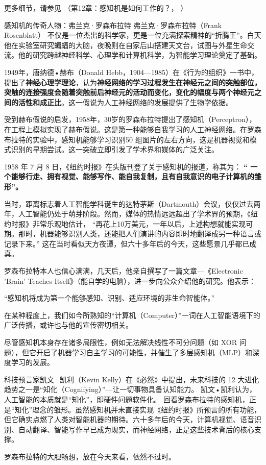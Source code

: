 更多细节，请参见 （第12章：感知机是如何工作的？， \cite{张玉宏2018深度学习之美}）

\begin{story}{感知机的传奇人物：弗兰克·罗森布拉特} 
弗兰克·罗森布拉特（Frank Rosenblatt） 不仅是一位杰出的科学家，更是一位充满探索精神的“折腾王”。白天他在实验室研究蝙蝠的大脑，夜晚则在自家后山搭建天文台，试图与外星生命交流。他的研究跨越神经科学、心理学和计算机科学，为智能学习理论奠定了基础。

1949年，唐纳德•赫布（Donald Hebb，1904—1985）在《行为的组织》一书中，提出了{\bf 神经心理学理论}，认为{\bf 神经网络的学习过程发生在神经元之间的突触部位，突触的连接强度会随着突触前后神经元的活动而变化，变化的幅度与两个神经元之间的活性和成正比}。这一假说为人工神经网络的发展提供了生物学依据。

受到赫布假说的启发，1958年，30岁的罗森布拉特提出了感知机（Perceptron），在工程上模拟实现了赫布假说。这是第一种能够自我学习的人工神经网络。在罗森布拉特的实验中，感知机能够学习识别50 组图片的左右方向，这是机器视觉和模式识别的早期尝试。这一突破立即引发了学术界和媒体的广泛关注。

1958 年 7 月 8 日，《纽约时报》在头版刊登了关于感知机的报道，称其为：
{\bf“ 一个能够行走、拥有视觉、能够写作、能自我复制，且有自我意识的电子计算机的雏形”。}

当时，距离标志着人工智能学科诞生的达特茅斯（Dartmouth）会议，仅仅过去两年，人工智能仍处于萌芽阶段。然而，媒体的热情远远超出了学术界的预期，《纽约时报》非常乐观地估计，
“再花上10万美元，一年以后，上述构想就能实现可期。那时，机器能够识别人类，还能把人们演讲的内容即时地翻译成另一种语言或记录下来。”
这在当时看似天方夜谭，但六十多年后的今天，这些愿景几乎都已成真。

罗森布拉特本人也信心满满，几天后，他亲自撰写了一篇文章---《Electronic 'Brain' Teaches Itself》（能自学的电脑），进一步向公众介绍他的研究。他表示：

“感知机将成为第一个能够感知、识别、适应环境的非生命智能体。”

在某种程度上，我们如今所熟知的“计算机（Computer）”一词在人工智能语境下的广泛传播，或许也与他的宣传密切相关。

尽管感知机本身存在诸多局限性，例如无法解决线性不可分问题（如 XOR 问题），但它开启了机器学习自主学习的可能性，并催生了多层感知机（MLP）和深度学习的发展。

科技预言家凯文·凯利（Kevin Kelly）在《必然》中提出，未来科技的 12 大进化趋势之一是“知化（Cognifying）”---让一切事物具备认知能力。
凯文•凯利认为，人工智能的本质就是“知化”，即硬件问题软件化。
回看罗森布拉特的感知机，正是“知化”理念的雏形。虽然感知机并未直接实现《纽约时报》所预言的所有功能，但它确实点燃了人类对智能机器的期待。六十多年后的今天，计算机视觉、语音识别、自动翻译、智能写作早已成为现实，而神经网络，正是这些技术背后的核心支撑。

罗森布拉特的大胆畅想，放在今天来看，依然不过时。
\end{story}

